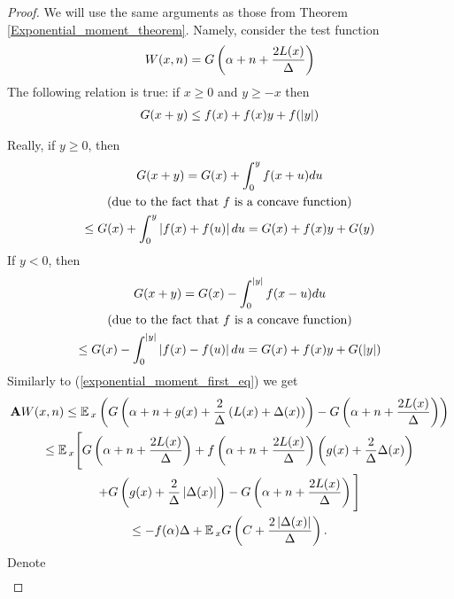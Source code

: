 	\begin{proof}
		We will use the same arguments as those from Theorem \ref{Exponential_moment_theorem}. Namely, consider the test function
		\begin{gather*}
		W(x, n) = G\left(\alpha + n + \frac{2L(x)}{\Delta}\right)
		\end{gather*}
		The following relation is true: if $x \geq 0$ and $y \geq -x$ then
		\begin{gather*}
		G(x + y) \leq f(x) + f(x)y + f(\left|y\right|)
		\end{gather*}
		
		Really, if $y \geq 0$, then
		\begin{gather*}
		G(x + y) = G(x) + \int_{0}^{y}f(x + u)du \\ \text{(due to the fact that $f$ is a concave function)} \\ \leq G(x) + \int_{0}^{y}\left|f(x) + f(u)\right|du = G(x) + f(x)y + G(y)
		\end{gather*}
		If $y < 0$, then
		\begin{gather*}
		G(x + y) = G(x) - \int_{0}^{\left|y\right|}f(x - u)du \\ \text{(due to the fact that $f$ is a concave function)} \\ \leq G(x) - \int_{0}^{\left|y\right|}\left|f(x) - f(u)\right|du = G(x) + f(x)y + G(\left|y\right|)
		\end{gather*}
		Similarly to (\ref{exponential_moment_first_eq}) we get
		\begin{gather*}
		\mathbf{A}W(x, n) \leq \operatorname*{\mathbb{E}}{}_{x}\left(G\left(\alpha + n + g(x) + \frac{2}{\Delta}\left(L(x) + \Delta(x)\right)\right) - G\left(\alpha + n + \frac{2L(x)}{\Delta}\right)\right) \\ \leq \operatorname*{\mathbb{E}}{}_{x}\Bigg[G\left(\alpha + n + \frac{2L(x)}{\Delta}\right) + f\left(\alpha + n + \frac{2L(x)}{\Delta}\right)\left(g(x) + \frac{2}{\Delta}\Delta(x)\right) \\ + G\left(g(x) + \frac{2}{\Delta}\left|\Delta(x)\right|\right) - G\left(\alpha + n + \frac{2L(x)}{\Delta}\right)\Bigg] \\ \leq -f(\alpha)\Delta + \operatorname*{\mathbb{E}}{}_{x}G\left(C + \frac{2\left|\Delta(x)\right|}{\Delta}\right).
		\end{gather*}
		Denote
		\begin{gather}

\end{gather}
\end{proof}
